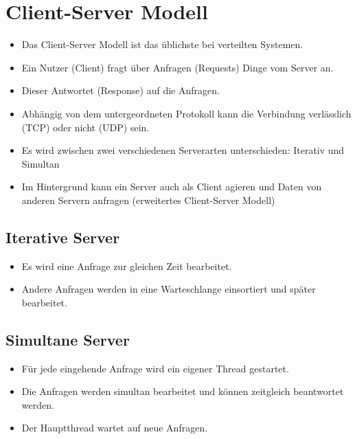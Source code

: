     \section{Client-Server Modell} %
        \begin{itemize}
        	\item Das Client-Server Modell ist das üblichste bei verteilten Systemen.
        	\item Ein Nutzer (Client) fragt über Anfragen (Requests) Dinge vom Server an.
        	\item Dieser Antwortet (Response) auf die Anfragen.
        	\item Abhängig von dem untergeordneten Protokoll kann die Verbindung verlässlich (TCP) oder nicht (UDP) sein.
        	\item Es wird zwischen zwei verschiedenen Serverarten unterschieden: Iterativ und Simultan
        	\item Im Hintergrund kann ein Server auch als Client agieren und Daten von anderen Servern anfragen (erweitertes Client-Server Modell)
        \end{itemize}

        \subsection{Iterative Server}
            \begin{itemize}
            	\item Es wird eine Anfrage zur gleichen Zeit bearbeitet.
            	\item Andere Anfragen werden in eine Warteschlange einsortiert und später bearbeitet.
            \end{itemize}

        \subsection{Simultane Server}
            \begin{itemize}
            	\item Für jede eingehende Anfrage wird ein eigener Thread gestartet.
            	\item Die Anfragen werden simultan bearbeitet und können zeitgleich beantwortet werden.
            	\item Der Hauptthread wartet auf neue Anfragen.
            \end{itemize}

